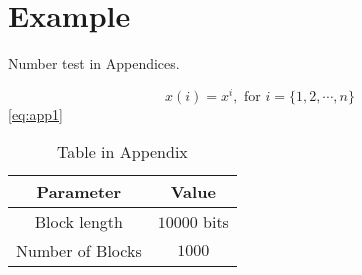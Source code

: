 \chapter{Example}\label{app:example}

Number test in Appendices.

\begin{equation}
x(i)=x^i, \textrm{ for } i=\{1,2,\cdots,n\} \label{eq:app1}
\end{equation}
\eqref{eq:app1}


\begin{table}[ht]
\centering
\begin{tabular}{c|c}
\hline
\bfseries Parameter & \bfseries Value \\
\hline
\hline
Block length & $10000$ bits \\
\hline
Number of Blocks & $1000$ \\
\hline
\end{tabular}
\caption{Table in Appendix}\label{table:app}
\end{table}
